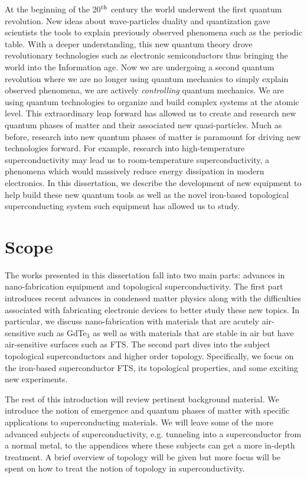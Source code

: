 At the beginning of the 20$\textsuperscript{th}$ century the world underwent the first quantum revolution. New ideas about wave-particles duality and quantization gave scientists the tools to explain previously observed phenomena such as the periodic table. With a deeper understanding, this new quantum theory drove revolutionary technologies such as electronic semiconductors thus bringing the world into the Information age. Now we are undergoing a second quantum revolution where we are no longer using quantum mechanics to simply explain observed phenomena, we are actively \textit{controlling} quantum mechanics.\cite{Dowling2003} We are using quantum technologies to organize and build complex systems at the atomic level. This extraordinary leap forward has allowed us to create and research new quantum phases of matter and their associated new quasi-particles. Much as before, research into new quantum phases of matter is paramount for driving new technologies forward. For example, research into high-temperature superconductivity may lead us to room-temperature superconductivity, a phenomena which would massively reduce energy dissipation in modern electronics. In this dissertation, we describe the development of new equipment to help build these new quantum tools as well as the novel iron-based topological superconducting system such equipment has allowed us to study.
\section{Scope}
The works presented in this dissertation fall into two main parts: advances in nano-fabrication equipment and topological superconductivity. The first part introduces recent advances in condensed matter physics along with the difficulties associated with fabricating electronic devices to better study these new topics. In particular, we discuss nano-fabrication with materials that are acutely air-sensitive such as GdTe$_{3}$ as well as with materials that are stable in air but have air-sensitive surfaces such as \ac{FTS}. The second part dives into the subject topological superconductors and higher order topology. Specifically, we focus on the iron-based superconductor \acl{FTS}, its topological properties, and some exciting new experiments.\par
The rest of this introduction will review pertinent background material. We introduce the notion of emergence and quantum phases of matter with specific applications to superconducting materials. We will leave some of the more advanced subjects of superconductivity, e.g. tunneling into a superconductor from a normal metal, to the appendices where these subjects can get a more in-depth treatment. A brief overview of topology will be given but more focus will be spent on how to treat the notion of topology in superconductivity.
